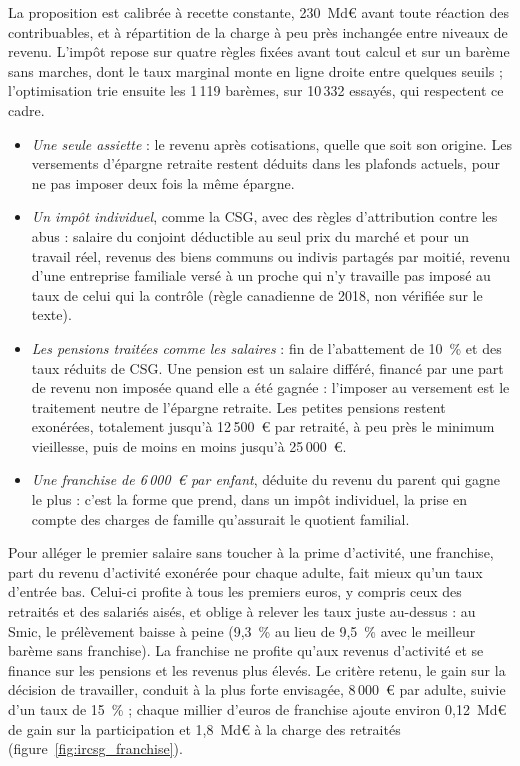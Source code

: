 \documentclass[11pt,a4paper]{article}
\begin{document}
La proposition est calibrée à recette constante, 230~Md€ avant toute réaction des contribuables, et à répartition de la
charge à peu près inchangée entre niveaux de revenu. L'impôt repose sur quatre règles fixées avant tout
calcul et sur un barème sans marches, dont le taux marginal monte en ligne droite entre quelques seuils ; l'optimisation
trie ensuite les 1\,119 barèmes, sur 10\,332 essayés, qui respectent ce cadre.
\begin{itemize}\setlength{\itemsep}{1pt}
\item \emph{Une seule assiette} : le revenu après cotisations, quelle que soit son origine. Les versements d'épargne
retraite restent déduits dans les plafonds actuels, pour ne pas imposer deux fois la même épargne.
\item \emph{Un impôt individuel}, comme la CSG, avec des règles d'attribution contre les abus : salaire du conjoint
déductible au seul prix du marché et pour un travail réel, revenus des biens communs ou indivis partagés par moitié,
revenu d'une entreprise familiale versé à un proche qui n'y travaille pas imposé au taux de celui qui la contrôle
(règle canadienne de 2018, non vérifiée sur le texte).
\item \emph{Les pensions traitées comme les salaires} : fin de l'abattement de 10~\% et des taux réduits de CSG. Une
pension est un salaire différé, financé par une part de revenu non imposée quand elle a été gagnée : l'imposer au
versement est le traitement neutre de l'épargne retraite. Les petites pensions restent exonérées, totalement jusqu'à
12\,500~€ par retraité, à peu près le minimum vieillesse, puis de moins en moins jusqu'à 25\,000~€.
\item \emph{Une franchise de 6\,000~€ par enfant}, déduite du revenu du parent qui gagne le plus : c'est la forme que
prend, dans un impôt individuel, la prise en compte des charges de famille qu'assurait le quotient familial.
\end{itemize}

Pour alléger le premier salaire sans toucher à la prime d'activité, une franchise, part du revenu d'activité exonérée
pour chaque adulte, fait mieux qu'un taux d'entrée bas. Celui-ci profite à tous les premiers euros, y compris ceux des
retraités et des salariés aisés, et oblige à relever les taux juste au-dessus : au Smic, le prélèvement baisse à peine
(9,3~\% au lieu de 9,5~\% avec le meilleur barème sans franchise). La franchise ne profite qu'aux revenus d'activité et
se finance sur les pensions et les revenus plus élevés. Le critère retenu, le gain sur la décision de travailler,
conduit à la plus forte envisagée, 8\,000~€ par adulte, suivie d'un taux de 15~\% ; chaque millier d'euros de franchise
ajoute environ 0,12~Md€ de gain sur la participation et 1,8~Md€ à la charge des retraités
(figure~\ref{fig:ircsg_franchise}).
\end{document}
